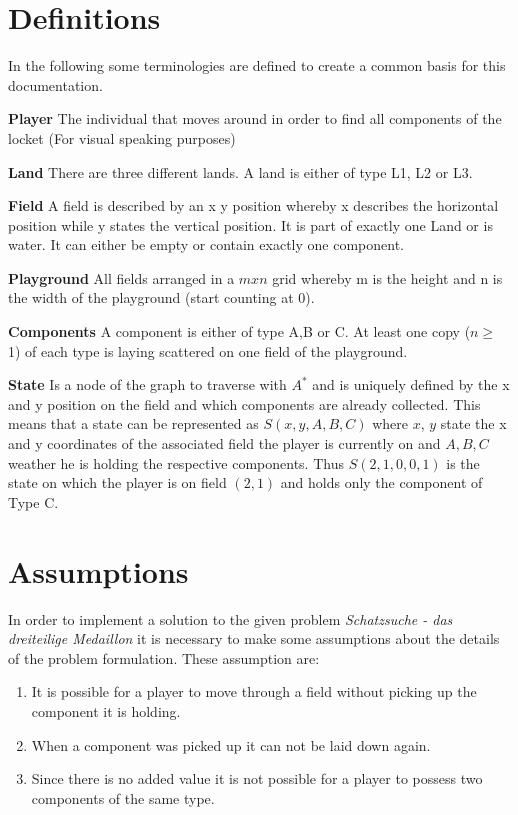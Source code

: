 \documentclass{article}
\newcommand{\problem}{Schatzsuche - das dreiteilige Medaillon}
\begin{document}
\section{Definitions}
In the following some terminologies are defined to create a common basis for this documentation.
\begin{description}
    \item{\textbf{Player}} The individual that moves around in order to find all components of the locket (For visual speaking purposes)
    \item{\textbf{Land}} There are three different lands. A land is either of type L1, L2 or L3.
    \item{\textbf{Field}} A field is described by an x y position whereby x describes the horizontal position while y states the vertical position. It is part of exactly one Land or is water. It can either be empty or contain exactly one component.
    \item{\textbf{Playground}} All fields arranged in a $m x n$ grid whereby m is the height and n is the width of the playground (start counting at 0).
    \item{\textbf{Components}} A component is either of type A,B or C. At least one copy ($n \geq \ $1) of each type is laying scattered on one field of the playground.
    \item{\textbf{State}\label{definition_state}}  Is a node of the graph to traverse with $A^*$ and is uniquely defined by the x and y position on the field and which components are already collected. 
    This means that a state can be represented as $S(x,y,A,B,C)$ where $x$, $y$ state the x and y coordinates of the associated field the player is currently on and $A, B, C$ weather he is holding the respective components. Thus $S(2,1,0,0,1)$ is the state on which the player is on field $(2,1)$ and holds only the component of Type C.
\end{description}

\section{Assumptions}
In order to implement a solution to the given problem \textit{\problem} it is necessary to make some assumptions about the details of the problem formulation. These assumption are:
\begin{enumerate}
    \item It is possible for a player to move through a field without picking up the component it is holding. 
    \item When a component was picked up it can not be laid down again.
    \item Since there is no added value it is not possible for a player to possess two components of the same type.
\end{enumerate}
\end{document}
